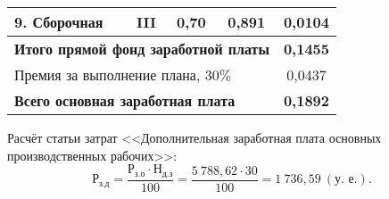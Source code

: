 \begin{table} [h!]
{\begin{tabular}{| m{4cm} | c | c | c | c |}
      9. Сборочная & III & 0{,}70 & 0{,}891 & 0,0104 \\
      \hline

      \multicolumn{4}{|l|}{\textbf{Итого прямой фонд заработной платы}}
      & \textbf{0,1455} \\
      \hline

      \multicolumn{4}{|l|}{Премия за выполнение плана, $30\%$}
      & 0,0437 \\
      \hline

      \multicolumn{4}{|l|}{\textbf{Всего основная заработная плата}}
      & \textbf{0,1892} \\
      \hline
    \end{tabular}
  }
\end{table}


Расчёт статьи затрат
<<Дополнительная заработная плата основных производственных рабочих>>:
\begin{equation*}
\text{Р}_{\text{з.д}} =
\dfrac{\text{Р}_{\text{з.о}} \cdot \text{Н}_{\text{д.з}}}{100} =
\dfrac{5~788{,}62 \cdot 30}{100} = 1~736{,}59~(\text{у.~е.}).
\end{equation*}

